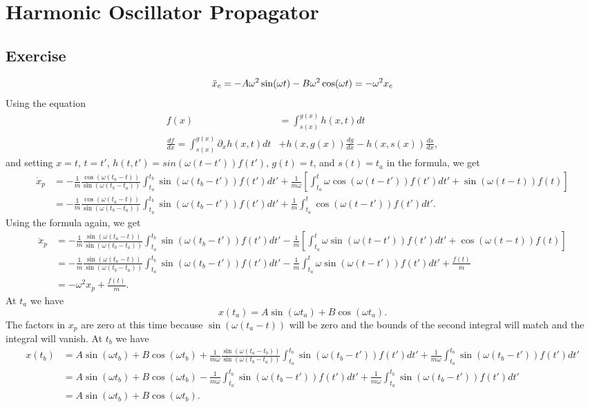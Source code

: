 \section{Harmonic Oscillator Propagator}
\subsection{Exercise}
\begin{equation}
    \ddot x_c = -A\omega^2\sin(\omega t)-B\omega^2 \cos(\omega t) = -\omega^2x_c \\
\end{equation}
Using the equation
\begin{align}
    f(x) &= \int _{s(x)}^{g(x)} h(x,t)dt \\
    \frac {df}{dx} = \int_{s(x)}^{g(x)}\partial_x h(x,t)dt&+h(x,g(x))\frac{dg}{dx}-h(x,s(x))\frac{ds}{dx},
\end{align}
and setting $x=t$, $t=t'$, $h(t,t')=sin(\omega(t-t'))f(t')$, $g(t)=t$, and $s(t)=t_a$ in the formula, we get
\begin{align}
    \dot x_p&=-\frac 1 m \frac{\cos(\omega(t_a-t))}{\sin(\omega(t_b-t_a))}\int_{t_a}^{t_b}\sin(\omega(t_b-t'))f(t')dt'+\frac{1}{m\omega}[\int_{t_a}^t\omega \cos(\omega(t-t'))f(t')dt'+\sin(\omega(t-t))f(t)]\\
    &=-\frac 1 m \frac{\cos(\omega(t_a-t))}{\sin(\omega(t_b-t_a))}\int_{t_a}^{t_b}\sin(\omega(t_b-t'))f(t')dt'+\frac{1}{m}\int_{t_a}^t \cos(\omega(t-t'))f(t')dt'.
\end{align}
Using the formula again, we get 
\begin{align}
    \ddot x_p&=-\frac 1 m \frac{\sin(\omega(t_a-t))}{\sin(\omega(t_b-t_a))}\int_{t_a}^{t_b}\sin(\omega(t_b-t'))f(t')dt'-\frac{1}{m}[\int_{t_a}^t\omega \sin(\omega(t-t'))f(t')dt'+\cos(\omega(t-t))f(t)] \\
    &=-\frac 1 m \frac{\sin(\omega(t_a-t))}{\sin(\omega(t_b-t_a))}\int_{t_a}^{t_b}\sin(\omega(t_b-t'))f(t')dt'-\frac{1}{m}\int_{t_a}^t\omega \sin(\omega(t-t'))f(t')dt'+\frac{f(t)}m \\
    &=-\omega^2 x_p + \frac{f(t)} m.
\end{align}
At $t_a$ we have
\begin{equation}
    x(t_a)=A\sin(\omega t_a)+B\cos(\omega t_a).
\end{equation}
The factors in $x_p$ are zero at this time because $\sin(\omega(t_a-t))$ will be zero and the bounds of the second integral will match and the integral will vanish. At $t_b$ we have
\begin{align}
    x(t_b)&=A\sin(\omega t_b)+B\cos(\omega t_b)+\frac 1 {m\omega} \frac{\sin(\omega(t_a-t_b))}{\sin(\omega(t_b-t_a))}\int_{t_a}^{t_b}\sin(\omega(t_b-t'))f(t')dt'+\frac{1}{m\omega}\int_{t_a}^{t_b} \sin(\omega(t_b-t'))f(t')dt'\\
    &=A\sin(\omega t_b)+B\cos(\omega t_b)-\frac 1 {m\omega} \int_{t_a}^{t_b}\sin(\omega(t_b-t'))f(t')dt'+\frac{1}{m\omega}\int_{t_a}^{t_b} \sin(\omega(t_b-t'))f(t')dt'\\
    &=A\sin(\omega t_b)+B\cos(\omega t_b).
\end{align}
